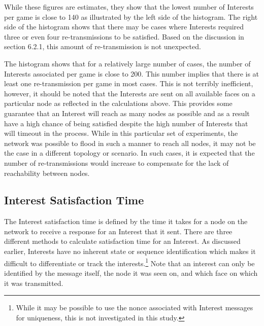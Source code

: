 \documentclass[a4paper,12pt]{report}      %
\begin{document}
While these figures are estimates, they show that the lowest number of Interests per game is close to 140 as illustrated by the left side of the histogram. The right side of the histogram shows that there may be cases where Interests required three or even four re-transmissions to be satisfied. Based on the discussion in section 6.2.1, this amount of re-transmission is not unexpected. 

The histogram shows that for a relatively large number of cases, the number of Interests associated per game is close to 200. This number implies that there is at least one re-transmission per game in most cases. This is not terribly inefficient, however, it should be noted that the Interests are sent on all available faces on a particular node as reflected in the calculations above. This provides some guarantee that an Interest will reach as many nodes as possible and as a result have a high chance of being satisfied despite the high number of Interests that will timeout in the process. While in this particular set of experiments, the network was possible to flood in such a manner to reach all nodes, it may not be the case in a different topology or scenario. In such cases, it is expected that the number of re-transmissions would increase to compensate for the lack of reachability between nodes.

\subsection{Interest Satisfaction Time}

The Interest satisfaction time is defined by the time it takes for a node on the network to receive a response for an Interest that it
sent. There are three different methods to calculate satisfaction time for an Interest. As discussed earlier,
Interests have no inherent state or sequence identification which makes it difficult to differentiate or
track the interests.\footnote{While it may be possible to use the nonce associated with Interest messages for uniqueness, this is not investigated in this study.} 
Note that an interest can only be identified by the message itself, the node it was seen on, and which face on which it was transmitted.
\end{document}
